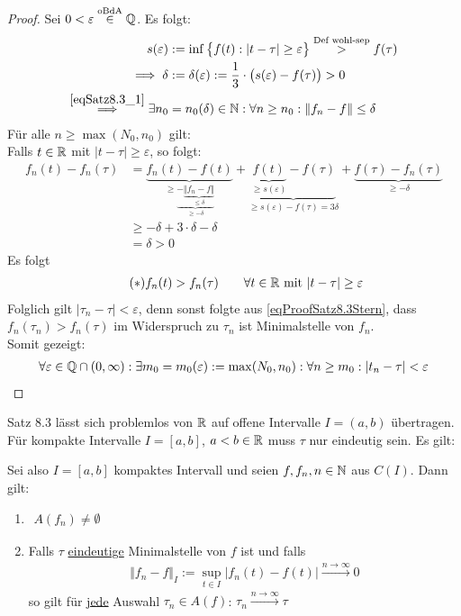 \begin{proof}
	Sei $0<\varepsilon\overset{\text{oBdA}}{\in}\mathbb{Q}$. Es folgt:
	\begin{align*}
		s(\varepsilon)&:=\inf\limits\big\lbrace f(t):|t-\tau|\geq\varepsilon\big\rbrace
		\overset{\text{Def wohl-sep}}{>}
		f(\tau)\\
		\implies
		\delta&:=\delta(\varepsilon):=\frac{1}{3}\cdot\big(s(\varepsilon)-f(\tau)\big)>0\\
		\overset{\eqref{eqSatz8.3_1}}{\implies}
		\exists n_0&=n_0(\delta)\in\mathbb{N}:\forall n\geq n_0:
		\Vert f_n-f\Vert\leq\delta
	\end{align*}
	Für alle $n\geq\max\limits(N_0,n_0)$ gilt:\\
	Falls $t\in\mathbb{R}$ mit $|t-\tau|\geq\varepsilon$, so folgt:
	\begin{align*}
		f_n(t)-f_n(\tau)
		&=\underbrace{f_n(t)-f(t)}_{\geq\underbrace{-\underbrace{\Vert f_n-f\Vert}_{\leq\delta}}_{\geq-\delta}}+\underbrace{\underbrace{f(t)}_{\geq s(\varepsilon)}-f(\tau)}_{\geq s(\varepsilon)-f(\tau)=3\delta}+\underbrace{f(\tau)-f_n(\tau)}_{\geq-\delta}\\
		&\geq-\delta+3\cdot\delta-\delta\\
		&=\delta>0
	\end{align*}
	Es folgt
	\begin{align}\label{eqProofSatz8.3Stern}\tag{$\ast$}
		f_n(t)>f_n(\tau)\qquad\forall t\in\mathbb{R}\text{ mit }|t-\tau|\geq\varepsilon
	\end{align}
	Folglich gilt $|\tau_n-\tau|<\varepsilon$, denn sonst folgte aus \eqref{eqProofSatz8.3Stern}, dass
	$f_n(\tau_n)>f_n(\tau)$ im Widerspruch zu $\tau_n$ ist Minimalstelle von $f_n$.\\
	Somit gezeigt:
	\begin{align*}
		\forall\varepsilon\in\mathbb{Q}\cap(0,\infty):\exists m_0=m_0(\varepsilon):=\max\limits(N_0,n_0):\forall n\geq m_0:|t_n-\tau|<\varepsilon
	\end{align*}
\end{proof}

Satz 8.3 lässt sich problemlos von $\mathbb{R}$ auf offene Intervalle $I=(a,b)$ übertragen.\nl
Für kompakte Intervalle $I=[a,b]$, $a<b\in\mathbb{R}$ muss $\tau$ nur eindeutig sein.
Es gilt:

\begin{satz}\label{satz8.4}
	Sei also $I=[a,b]$ kompaktes Intervall und seien $f,f_n,n\in\mathbb{N}$ aus $C(I)$. 
	Dann gilt:
	\begin{enumerate}[label=(\arabic*)]
		\item $\begin{aligned}
			A(f_n)\neq\emptyset
		\end{aligned}$
		\item Falls $\tau$ \underline{eindeutige} Minimalstelle von $f$ ist und falls
		\begin{align*}
			\Vert f_n-f\Vert_I:=\sup\limits_{t\in I}\big|f_n(t)-f(t)\big|\overset{n\to\infty}{\longrightarrow}0
		\end{align*}
		so gilt für \underline{jede} Auswahl $\tau_n\in A(f)$:
		$\tau_n\overset{n\to\infty}{\longrightarrow}\tau$
	\end{enumerate}
\end{satz}

